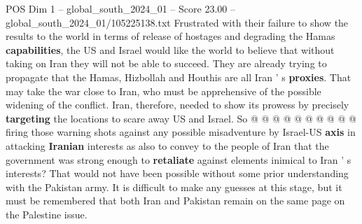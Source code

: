 \begin{textsample}{POS Dim 1 – global\_south\_2024\_01 – Score 23.00 – global\_south\_2024\_01/105225138.txt}
Frustrated with their failure to show the results to the world in terms of release of hostages and degrading the Hamas \textbf{capabilities}, the US and Israel would like the world to believe that without taking on Iran they will not be able to succeed.
They are already trying to propagate that the Hamas, Hizbollah and Houthis are all Iran ' s \textbf{proxies}.
That may take the war close to Iran, who must be apprehensive of the possible widening of the conflict.
Iran, therefore, needed to show its prowess by precisely \textbf{targeting} the locations to scare away US and Israel.
So @ @ @ @ @ @ @ @ @ @ firing those warning shots against any possible misadventure by Israel-US \textbf{axis} in attacking \textbf{Iranian} interests as also to convey to the people of Iran that the government was strong enough to \textbf{retaliate} against elements inimical to Iran ' s interests?
That would not have been possible without some prior understanding with the Pakistan army.
It is difficult to make any guesses at this stage, but it must be remembered that both Iran and Pakistan remain on the same page on the Palestine issue.

\end{textsample}
